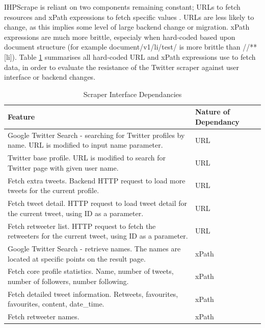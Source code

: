 
IHPScrape is reliant on two components remaining constant; URLs to fetch resources and xPath expressions to fetch specific values \cite{berglund2007xml}. URLs are less likely to change, as this implies some level of large backend change or migration. xPath expressions are much more brittle, especialy when hard-coded based upon document structure (for example document/v1/li/test/ is more brittle than //**[li]). Table \ref{tab:interface_depend} summarises all hard-coded URL and xPath expressions use to fetch data, in order to evaluate the resistance of the Twitter scraper against user interface or backend changes.


\begin{table}[h!]
\begin{center}
  \begin{tabular}{| p{9cm} | l | }
  \hline
   \textbf{Feature} & \textbf{Nature of Dependancy}  \\ \hline
   Google Twitter Search - searching for Twitter profiles by name. URL is modified to input name parameter. & URL \\ \hline
   Twitter base profile. URL is modified to search for Twitter page with given user name. & URL \\ \hline
   Fetch extra tweets. Backend HTTP request to load more tweets for the current profile. & URL  \\ \hline
   Fetch tweet detail. HTTP request to load tweet detail for the current tweet, using ID as a parameter.& URL \\ \hline
   Fetch retweeter list. HTTP request to fetch the retweeters for the current tweet, using ID as a parameter.& URL \\ \hline
   Google Twitter Search - retrieve names. The names are located at specific points on the result page.& xPath \\ \hline
   Fetch core profile statistics. Name, number of tweets, number of followers, number following.&  xPath \\ \hline
   Fetch detailed tweet information. Retweets, favourites, favourites, content, date\_time.&  xPath \\ \hline
   Fetch retweeter names. &xPath \\ \hline
  \end{tabular}  
\end{center}
\caption{Scraper Interface Dependancies}
\label{tab:interface_depend}
\end{table}

